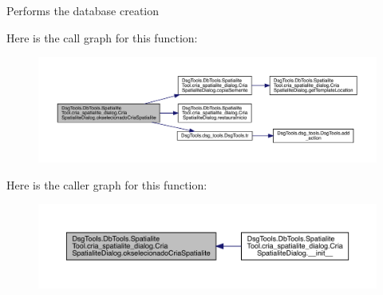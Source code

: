 \begin{DoxyVerb}Performs the database creation
\end{DoxyVerb}
 Here is the call graph for this function\+:
\nopagebreak
\begin{figure}[H]
\begin{center}
\leavevmode
\includegraphics[width=350pt]{class_dsg_tools_1_1_db_tools_1_1_spatialite_tool_1_1cria__spatialite__dialog_1_1_cria_spatialite_dialog_ab4f2578b26570dea3b1c388792a233d8_cgraph}
\end{center}
\end{figure}
Here is the caller graph for this function\+:
\nopagebreak
\begin{figure}[H]
\begin{center}
\leavevmode
\includegraphics[width=350pt]{class_dsg_tools_1_1_db_tools_1_1_spatialite_tool_1_1cria__spatialite__dialog_1_1_cria_spatialite_dialog_ab4f2578b26570dea3b1c388792a233d8_icgraph}
\end{center}
\end{figure}
\mbox{\label{class_dsg_tools_1_1_db_tools_1_1_spatialite_tool_1_1cria__spatialite__dialog_1_1_cria_spatialite_dialog_a302a63967b368e32910dbfa56f6e583a}} 
